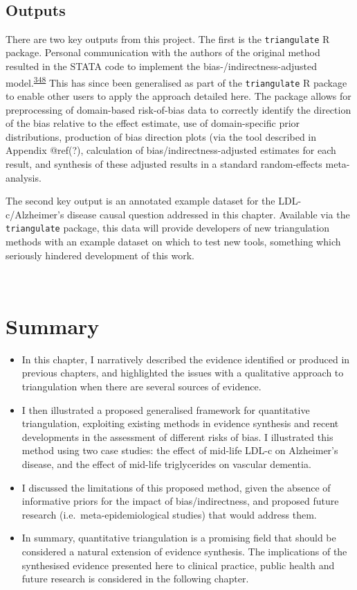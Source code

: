 \documentclass[a4paper, twoside]{templates/ociamthesis}
\begin{document}
~

\hypertarget{tri-software}{%
\subsection{Outputs}\label{tri-software}}

There are two key outputs from this project. The first is the \texttt{triangulate} R package. Personal communication with the authors of the original method resulted in the STATA code to implement the bias-/indirectness-adjusted model.\textsuperscript{\protect\hyperlink{ref-turner2009}{348}} This has since been generalised as part of the \texttt{triangulate} R package to enable other users to apply the approach detailed here. The package allows for preprocessing of domain-based risk-of-bias data to correctly identify the direction of the bias relative to the effect estimate, use of domain-specific prior distributions, production of bias direction plots (via the tool described in Appendix @ref(?), calculation of bias/indirectness-adjusted estimates for each result, and synthesis of these adjusted results in a standard random-effects meta-analysis.

The second key output is an annotated example dataset for the LDL-c/Alzheimer's disease causal question addressed in this chapter. Available via the \texttt{triangulate} package, this data will provide developers of new triangulation methods with an example dataset on which to test new tools, something which seriously hindered development of this work.

~

\hypertarget{summary-6}{%
\section{Summary}\label{summary-6}}

\begin{itemize}
\item
  In this chapter, I narratively described the evidence identified or produced in previous chapters, and highlighted the issues with a qualitative approach to triangulation when there are several sources of evidence.
\item
  I then illustrated a proposed generalised framework for quantitative triangulation, exploiting existing methods in evidence synthesis and recent developments in the assessment of different risks of bias. I illustrated this method using two case studies: the effect of mid-life LDL-c on Alzheimer's disease, and the effect of mid-life triglycerides on vascular dementia.
\item
  I discussed the limitations of this proposed method, given the absence of informative priors for the impact of bias/indirectness, and proposed future research (i.e.~meta-epidemiological studies) that would address them.
\item
  In summary, quantitative triangulation is a promising field that should be considered a natural extension of evidence synthesis. The implications of the synthesised evidence presented here to clinical practice, public health and future research is considered in the following chapter.
\end{itemize}
\end{document}
